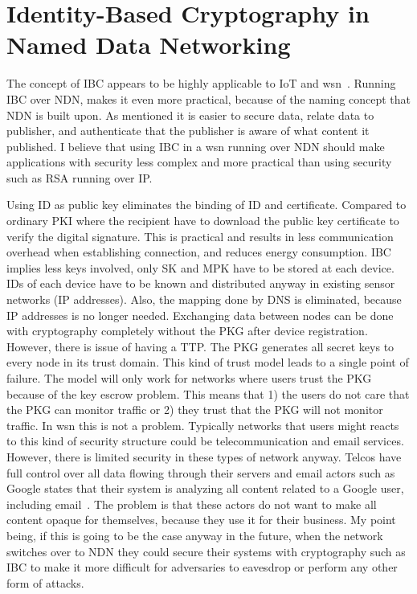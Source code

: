 
\section{Identity-Based Cryptography in Named Data Networking}
The concept of \gls{IBC} appears to be highly applicable to \gls{IoT} and \gls{wsn}~\cite{Patil:2012:SWS:2464778}.
Running \gls{IBC} over \gls{NDN}, makes it even more practical, because of the naming concept that \gls{NDN} is built upon. 
As mentioned it is easier to secure data, relate data to publisher, and authenticate that the publisher is aware of what content it published. 
I believe that using \gls{IBC} in a \gls{wsn} running over \gls{NDN} should make applications with security less complex and more practical than using security such as RSA running over \gls{IP}. 

Using \gls{ID} as public key eliminates the binding of ID and certificate. 
Compared to ordinary \gls{PKI} where the recipient have to download the public key certificate to verify the digital signature.
This is practical and results in less communication overhead when establishing connection, and reduces energy consumption.
\gls{IBC} implies less keys involved, only \gls{SK} and \gls{MPK} have to be stored at each device. 
\gls{ID}s of each device have to be known and distributed anyway in existing sensor networks (IP addresses).
Also, the mapping done by \gls{DNS} is eliminated, because IP addresses is no longer needed.
Exchanging data between nodes can be done with cryptography completely without the \gls{PKG} after device registration.
However, there is issue of having a \gls{TTP}.
The \gls{PKG} generates all secret keys to every node in its trust domain. 
This kind of trust model leads to a single point of failure.
The model will only work for networks where users trust the \gls{PKG} because of the key escrow problem.
This means that 1) the users do not care that the \gls{PKG} can monitor traffic or 2) they trust that the \gls{PKG} will not monitor traffic.
In \gls{wsn} this is not a problem.
Typically networks that users might reacts to this kind of security structure could be telecommunication and email services. 
However, there is limited security in these types of network anyway. 
Telcos have full control over all data flowing through their servers and email actors such as Google states that their system is analyzing all content related to a Google user, including email~\cite{google_reads_email}.
The problem is that these actors do not want to make all content opaque for themselves, because they use it for their business. 
My point being, if this is going to be the case anyway in the future, when the network switches over to \gls{NDN} they could secure their systems with cryptography such as \gls{IBC} to make it more difficult for adversaries to eavesdrop or perform any other form of attacks.

